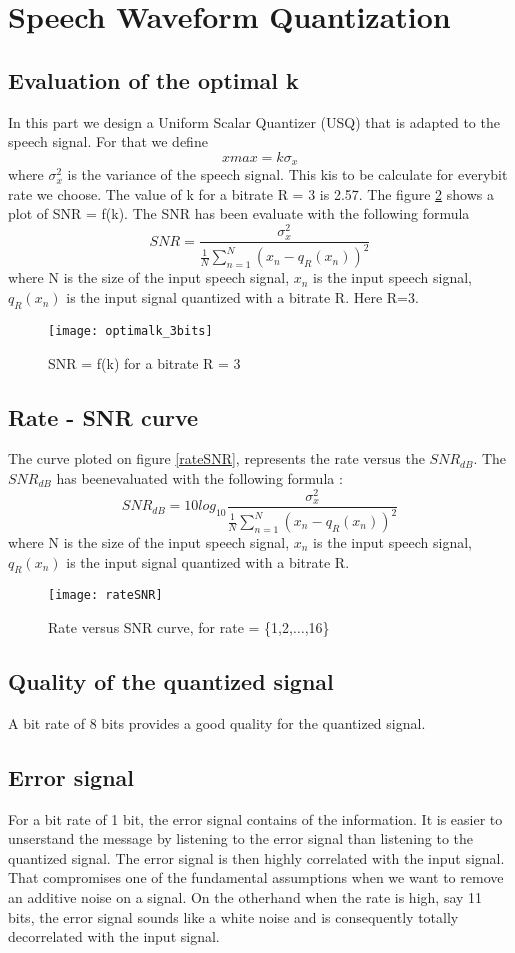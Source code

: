 \section{Speech Waveform Quantization}
\subsection{Evaluation of the optimal k}
In this part we design a Uniform Scalar Quantizer (USQ) that is adapted to the speech signal. For that we define \[xmax = k\sigma_x\] where $\sigma_x^2$ is the variance of the speech signal. This kis to be calculate for everybit rate we choose. The value of k for a bitrate R = 3 is 2.57. The figure \ref{optimalk} shows a plot of SNR = f(k). The SNR has been evaluate with the following formula \[ SNR = \frac{\sigma_x^2 }{\frac{1}{N}\sum_{n=1}^N(x_n - q_R(x_n))^2 } \] where N is the size of the input speech signal, $x_n$ is the input speech signal, $q_R(x_n)$ is the input signal quantized with a bitrate R. Here R=3.


\begin{figure}[h!]
\centering
\texttt{[image: optimalk\_3bits]}
\caption{SNR = f(k) for a bitrate R = 3}
\label{optimalk}
\end{figure}

\subsection{Rate - SNR curve}
The curve ploted on figure \ref{rateSNR}, represents the rate versus the $SNR_{dB}$. The $SNR_{dB}$ has beenevaluated with the following formula : \[ SNR_{dB} = 10log_{10}\frac{\sigma_x^2}{\frac{1}{N}\sum_{n=1}^N(x_n - q_R(x_n))^2}\] where N is the size of the input speech signal, $x_n$ is the input speech signal, $q_R(x_n)$ is the input signal quantized with a bitrate R.

\begin{figure}[h!]
  \centering
  \texttt{[image: rateSNR]}
  \caption{Rate versus SNR curve, for rate = \{1,2,$\dots$,16\}}
  \label{optimalk}
\end{figure}

\subsection{Quality of the quantized signal}
A bit rate of 8 bits provides a good quality for the quantized signal.
\subsection{Error signal}
For a bit rate of 1 bit, the error signal contains of the information. It is easier to unserstand the message by listening to the error signal than listening to the quantized signal. The error signal is then highly correlated with the input signal. That compromises one of the fundamental assumptions when we want to remove an additive noise on a signal. On the otherhand when the rate is high, say 11 bits, the error signal sounds like a white noise and is consequently totally decorrelated with the input signal.

